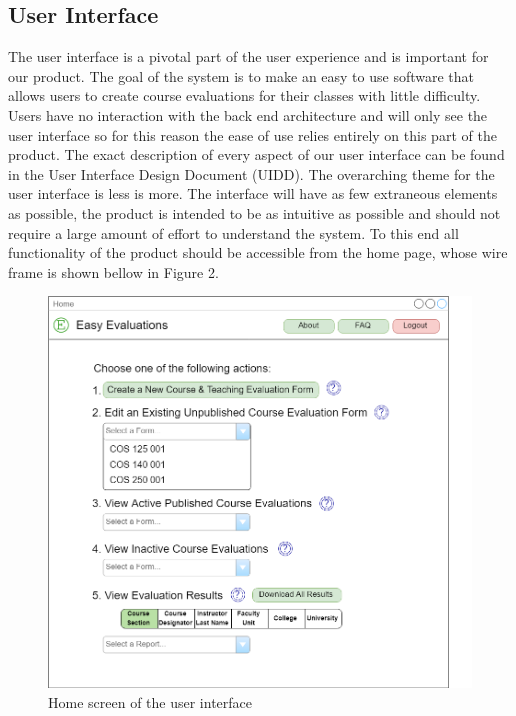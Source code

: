 \documentclass{article}
\begin{document}
\pagebreak
\subsection{User Interface}
The user interface is a pivotal part of the user experience and is important for our product. The goal of the system is to make an easy to use software that allows users to create course evaluations for their classes with little difficulty.  Users have no interaction with the back end architecture and will only see the user interface so for this reason the ease of use relies entirely on this part of the product.  The exact description of every aspect of our user interface can be found in the User Interface Design Document (UIDD).  The overarching theme for the user interface is less is more.  The interface will have as few extraneous elements as possible, the product is intended to be as intuitive as possible and should not require a large amount of effort to understand the system.  To this end all functionality of the product should be accessible from the home page, whose wire frame is shown bellow in Figure 2.  
\begin{center}
\begin{figure}[H]
    \centering
    \caption{Home screen of the user interface}
    \includegraphics[width=5.5in]{images/home_screen.png}
\end{figure}
\end{center}
\end{document}
